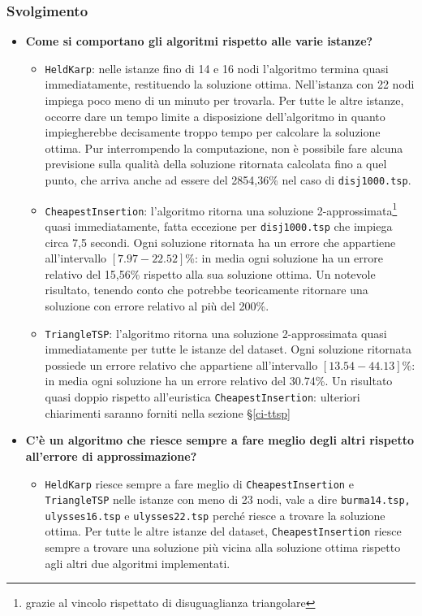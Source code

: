 \subsubsection{Svolgimento}
\begin{itemize}
	\item \textbf{Come si comportano gli algoritmi rispetto alle varie istanze?}
	\begin{itemize}
		\item \texttt{HeldKarp}: nelle istanze fino di 14 e 16 nodi l'algoritmo termina quasi immediatamente, restituendo la soluzione ottima. Nell'istanza con 22 nodi impiega poco meno di un minuto per trovarla. Per tutte le altre istanze, occorre dare un tempo limite a disposizione dell'algoritmo in quanto impiegherebbe decisamente troppo tempo per calcolare la soluzione ottima. Pur interrompendo la computazione, non è possibile fare alcuna previsione sulla qualità della soluzione ritornata calcolata fino a quel punto, che arriva anche ad essere del 2854,36\% nel caso di \texttt{disj1000.tsp}.
		\item \texttt{CheapestInsertion}: l'algoritmo ritorna una soluzione 2-approssimata\footnote{grazie al vincolo rispettato di disuguaglianza triangolare} quasi immediatamente, fatta eccezione per \texttt{disj1000.tsp} che impiega circa 7,5 secondi. Ogni soluzione ritornata ha un errore che appartiene all'intervallo $[7.97 - 22.52]$\%: in media ogni soluzione ha un errore relativo del 15,56\% rispetto alla sua soluzione ottima. Un notevole risultato, tenendo conto che potrebbe teoricamente ritornare una soluzione con errore relativo al più del 200\%.
		\item \texttt{TriangleTSP}: l'algoritmo ritorna una soluzione 2-approssimata quasi immediatamente per tutte le istanze del dataset. Ogni soluzione ritornata possiede un errore relativo che appartiene all'intervallo $[13.54 - 44.13]$\%: in media ogni soluzione ha un errore relativo del 30.74\%. Un risultato quasi doppio rispetto all'euristica \texttt{CheapestInsertion}: ulteriori chiarimenti saranno forniti nella sezione \S\ref{ci-ttsp}
	\end{itemize}
	\item \textbf{C'è un algoritmo che riesce sempre a fare meglio degli altri rispetto all'errore di approssimazione?}
	\begin{itemize}
		\item \texttt{HeldKarp} riesce sempre a fare meglio di \texttt{CheapestInsertion} e \texttt{TriangleTSP} nelle istanze con meno di 23 nodi, vale a dire \texttt{burma14.tsp, ulysses16.tsp} e \texttt{ulysses22.tsp} perché riesce a trovare la soluzione ottima. Per tutte le altre istanze del dataset, \texttt{CheapestInsertion} riesce sempre a trovare una soluzione più vicina alla soluzione ottima rispetto agli altri due algoritmi implementati.

\end{itemize}
\end{itemize}
